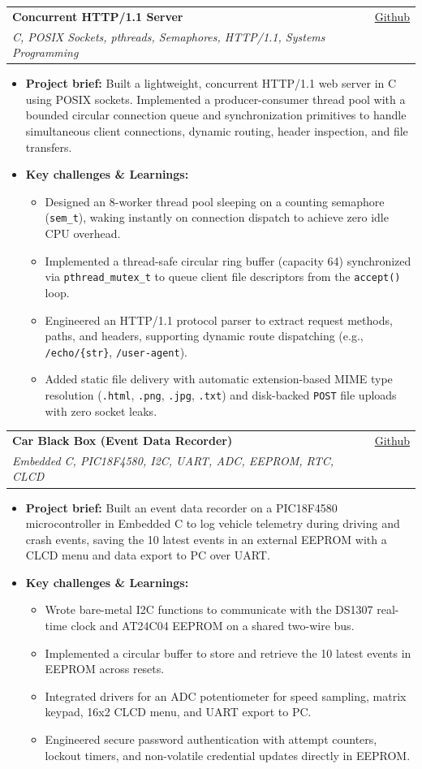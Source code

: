 \documentclass[letterpaper,11pt]{article}
\makeatletter
\newcommand{\resumeItem}[1]{
  \item
    {#1 \vspace{-3pt}}
}
\newcommand{\resumeSubheading}[4]{
  \vspace{-3pt}\item
    \begin{tabular*}{0.97\textwidth}[t]{l@{\extracolsep{\fill}}r}
      \textbf{#1} & #2 \\
      \textit{#3} & {#4} \\
    \end{tabular*}\vspace{-8pt}
}
\newcommand{\resumeItemListStart}{\begin{itemize}[topsep=1pt, itemsep=0.5pt, parsep=0pt]}
\newcommand{\resumeItemListEnd}{\end{itemize}\vspace{-6pt}}
\makeatother
\begin{document}
  \newpage

    \resumeSubheading
      {Concurrent HTTP/1.1 Server}{\href{https://github.com/k0-R0/HTTP_Server}{Github}}
      {C, POSIX Sockets, pthreads, Semaphores, HTTP/1.1, Systems Programming}{}
      \resumeItemListStart
        \resumeItem{\textbf{Project brief:} Built a lightweight, concurrent HTTP/1.1 web server in C using POSIX sockets. Implemented a producer-consumer thread pool with a bounded circular connection queue and synchronization primitives to handle simultaneous client connections, dynamic routing, header inspection, and file transfers.}
        \resumeItem{\textbf{Key challenges \& Learnings:}}
        \resumeItemListStart
            \resumeItem{Designed an 8-worker thread pool sleeping on a counting semaphore (\texttt{sem\_t}), waking instantly on connection dispatch to achieve zero idle CPU overhead.}
            \resumeItem{Implemented a thread-safe circular ring buffer (capacity 64) synchronized via \texttt{pthread\_mutex\_t} to queue client file descriptors from the \texttt{accept()} loop.}
            \resumeItem{Engineered an HTTP/1.1 protocol parser to extract request methods, paths, and headers, supporting dynamic route dispatching (e.g., \texttt{/echo/\{str\}}, \texttt{/user-agent}).}
            \resumeItem{Added static file delivery with automatic extension-based MIME type resolution (\texttt{.html}, \texttt{.png}, \texttt{.jpg}, \texttt{.txt}) and disk-backed \texttt{POST} file uploads with zero socket leaks.}
        \resumeItemListEnd
      \resumeItemListEnd

    \resumeSubheading
      {Car Black Box (Event Data Recorder)}{\href{https://github.com/k0-R0/car_blackbox}{Github}}
      {Embedded C, PIC18F4580, I2C, UART, ADC, EEPROM, RTC, CLCD}{}
      \resumeItemListStart
        \resumeItem{\textbf{Project brief:} Built an event data recorder on a PIC18F4580 microcontroller in Embedded C to log vehicle telemetry during driving and crash events, saving the 10 latest events in an external EEPROM with a CLCD menu and data export to PC over UART.}
        \resumeItem{\textbf{Key challenges \& Learnings:}}
        \resumeItemListStart
            \resumeItem{Wrote bare-metal I2C functions to communicate with the DS1307 real-time clock and AT24C04 EEPROM on a shared two-wire bus.}
            \resumeItem{Implemented a circular buffer to store and retrieve the 10 latest events in EEPROM across resets.}
            \resumeItem{Integrated drivers for an ADC potentiometer for speed sampling, matrix keypad, 16x2 CLCD menu, and UART export to PC.}
            \resumeItem{Engineered secure password authentication with attempt counters, lockout timers, and non-volatile credential updates directly in EEPROM.}
        \resumeItemListEnd
      \resumeItemListEnd
\end{document}
